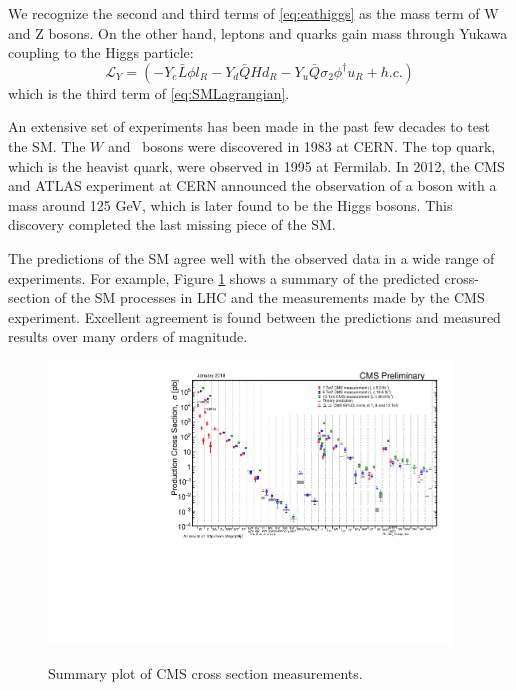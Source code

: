 \documentclass[thesis.tex]{subfiles}
\begin{document}
We recognize the second and third terms of \ref{eq:eathiggs} as the mass term of W and Z bosons. On the other hand, leptons and quarks gain mass through Yukawa coupling to the Higgs particle:
	\begin{equation}
		\mathcal{L}_Y = (- Y_e \bar{L} \phi l_R - Y_d \bar{Q}H d_R - Y_u \bar{Q} \sigma_2 \phi^\dagger u_R + h.c.)
	\end{equation}
which is the third term of  \ref{eq:SMLagrangian}. 


An extensive set of experiments has been made in the past few decades to test the SM. 
The $W$ and \PZ~bosons were discovered in 1983 at CERN. The top quark, which is the heavist quark, were observed in 1995 at Fermilab. 
In 2012, the CMS and ATLAS experiment at CERN announced the observation of a boson with a mass around 125 GeV, which is later found to be the Higgs bosons.
This discovery completed the last missing piece of the SM.  

The predictions of the SM agree well with the observed data in a wide range of experiments. 
For example, Figure \ref{fig1-1} shows a summary of the predicted cross-section of the SM processes in LHC and the measurements made by the CMS experiment.
Excellent agreement is found between the predictions and measured results over many orders of magnitude.

	\begin{figure}[h]
		\centering
	\includegraphics[width=0.95\textwidth]{plot/SigmaNew_v0.pdf}
	\label{fig1-1}
	\caption{Summary plot of CMS cross section measurements.}
	\end{figure}
	
\FloatBarrier
\end{document}
